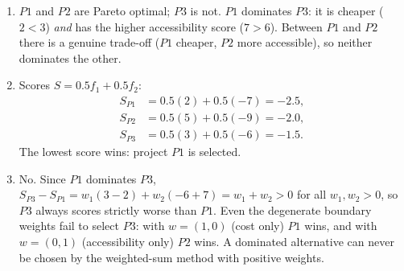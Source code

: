 \begin{enumerate}
\item $P1$ and $P2$ are Pareto optimal; $P3$ is not. $P1$ dominates $P3$: it
is cheaper ($2 < 3$) \emph{and} has the higher accessibility score
($7 > 6$). Between $P1$ and $P2$ there is a genuine trade-off ($P1$ cheaper,
$P2$ more accessible), so neither dominates the other.
\item Scores $S = 0.5 f_1 + 0.5 f_2$:
\begin{align*}
S_{P1} &= 0.5(2) + 0.5(-7) = -2.5, \\
S_{P2} &= 0.5(5) + 0.5(-9) = -2.0, \\
S_{P3} &= 0.5(3) + 0.5(-6) = -1.5.
\end{align*}
The lowest score wins: project $P1$ is selected.
\item No. Since $P1$ dominates $P3$,
$S_{P3} - S_{P1} = w_1(3-2) + w_2(-6+7) = w_1 + w_2 > 0$ for all
$w_1, w_2 > 0$, so $P3$ always scores strictly worse than $P1$. Even the
degenerate boundary weights fail to select $P3$: with $w = (1,0)$ (cost
only) $P1$ wins, and with $w = (0,1)$ (accessibility only) $P2$ wins. A
dominated alternative can never be chosen by the weighted-sum method with
positive weights.
\end{enumerate}



